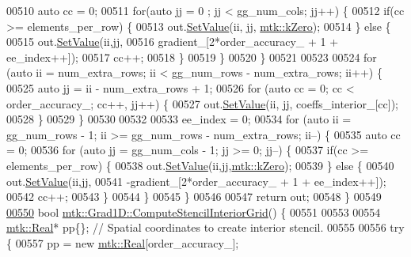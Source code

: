 \begin{DoxyCode}
{{00510     \textcolor{keyword}{auto} cc = 0;
00511     \textcolor{keywordflow}{for}(\textcolor{keyword}{auto} jj = 0 ; jj < gg\_num\_cols; jj++) \{
00512       \textcolor{keywordflow}{if}(cc >= elements\_per\_row) \{
00513         out.\hyperlink{classmtk_1_1DenseMatrix_a784ce5784109ac86bfb9d8562b334b13}{SetValue}(ii, jj, \hyperlink{group__c01-roots_ga59a451a5fae30d59649bcda274fea271}{mtk::kZero});
00514       \} \textcolor{keywordflow}{else} \{
00515         out.\hyperlink{classmtk_1_1DenseMatrix_a784ce5784109ac86bfb9d8562b334b13}{SetValue}(ii,jj,
00516                      gradient\_[2*order\_accuracy\_ + 1 + ee\_index++]);
00517         cc++;
00518       \}
00519     \}
00520   \}
00521 
00523 
00524   \textcolor{keywordflow}{for} (\textcolor{keyword}{auto} ii = num\_extra\_rows; ii < gg\_num\_rows - num\_extra\_rows; ii++) \{
00525     \textcolor{keyword}{auto} jj = ii - num\_extra\_rows + 1;
00526     \textcolor{keywordflow}{for} (\textcolor{keyword}{auto} cc = 0; cc < order\_accuracy\_; cc++, jj++) \{
00527       out.\hyperlink{classmtk_1_1DenseMatrix_a784ce5784109ac86bfb9d8562b334b13}{SetValue}(ii, jj, coeffs\_interior\_[cc]);
00528     \}
00529   \}
00530 
00532 
00533   ee\_index = 0;
00534   \textcolor{keywordflow}{for} (\textcolor{keyword}{auto} ii = gg\_num\_rows - 1; ii >= gg\_num\_rows - num\_extra\_rows; ii--) \{
00535     \textcolor{keyword}{auto} cc = 0;
00536     \textcolor{keywordflow}{for} (\textcolor{keyword}{auto} jj = gg\_num\_cols - 1; jj >= 0; jj--) \{
00537       \textcolor{keywordflow}{if}(cc >= elements\_per\_row) \{
00538         out.\hyperlink{classmtk_1_1DenseMatrix_a784ce5784109ac86bfb9d8562b334b13}{SetValue}(ii,jj,\hyperlink{group__c01-roots_ga59a451a5fae30d59649bcda274fea271}{mtk::kZero});
00539       \} \textcolor{keywordflow}{else} \{
00540         out.\hyperlink{classmtk_1_1DenseMatrix_a784ce5784109ac86bfb9d8562b334b13}{SetValue}(ii,jj,
00541                      -gradient\_[2*order\_accuracy\_ + 1 + ee\_index++]);
00542         cc++;
00543       \}
00544      \}
00545   \}
00546 
00547   \textcolor{keywordflow}{return} out;
00548 \}
00549 
\hypertarget{mtk__grad__1d_8cc_source_l00550}{}\hyperlink{classmtk_1_1Grad1D_ad6df25cc9dfc85ff8562ae3605486976}{00550} \textcolor{keywordtype}{bool} \hyperlink{classmtk_1_1Grad1D_ad6df25cc9dfc85ff8562ae3605486976}{mtk::Grad1D::ComputeStencilInteriorGrid}() \{
00551 
00553 
00554   \hyperlink{group__c01-roots_gac080bbbf5cbb5502c9f00405f894857d}{mtk::Real}* pp\{\}; \textcolor{comment}{// Spatial coordinates to create interior stencil.}
00555 
00556   \textcolor{keywordflow}{try} \{
00557     pp = \textcolor{keyword}{new} \hyperlink{group__c01-roots_gac080bbbf5cbb5502c9f00405f894857d}{mtk::Real}[order\_accuracy\_];
}}
\end{DoxyCode}
